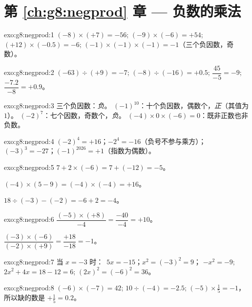 \section*{第 \ref{ch:g8:negprod} 章 --- 负数的乘法}

\begin{solution}{exo:g8:negprod:1}
$(-8) \times (+7) = -56$; \quad
$(-9) \times (-6) = +54$; \quad
$(+12) \times (-0.5) = -6$; \quad
$(-1) \times (-1) \times (-1) = -1$（三个负因数，奇数）。
\end{solution}

\begin{solution}{exo:g8:negprod:2}
$(-63) \div (+9) = -7$; \quad
$(-8) \div (-16) = +0.5$; \quad
$\dfrac{45}{-5} = -9$; \quad
$\dfrac{-7.2}{-8} = +0.9$。
\end{solution}

\begin{solution}{exo:g8:negprod:3}
三个负因数：\emph{负}。\quad
$(-1)^{10}$：十个负因数，偶数个，\emph{正}（其值为
$1$）。\quad
$(-2)^7$：七个因数，奇数个，\emph{负}。\quad
$(-4) \times 0 \times (-6) = 0$：既非正数也非负数。
\end{solution}

\begin{solution}{exo:g8:negprod:4}
$(-2)^4 = +16$；\quad $-2^4 = -16$（负号不参与乘方）；\quad
$(-3)^3 = -27$；\quad $(-1)^{2026} = +1$（指数为偶数）。
\end{solution}

\begin{solution}{exo:g8:negprod:5}
$7 + 2 \times (-6) = 7 + (-12) = -5$。

$(-4) \times (5 - 9) = (-4) \times (-4) = +16$。

$18 \div (-3) - (-2) = -6 + 2 = -4$。
\end{solution}

\begin{solution}{exo:g8:negprod:6}
$\dfrac{(-5) \times (+8)}{-4} = \dfrac{-40}{-4} = +10$。

$\dfrac{(-3) \times (-6)}{(-2) \times (+9)} = \dfrac{+18}{-18} = -1$。
\end{solution}

\begin{solution}{exo:g8:negprod:7}
当 $x = -3$ 时：\ $5x = -15$；\quad $x^2 = (-3)^2 = 9$；\quad
$-x^2 = -9$; \quad $2x^2 + 4x = 18 - 12 = 6$; \quad
$(2x)^2 = (-6)^2 = 36$。
\end{solution}

\begin{solution}{exo:g8:negprod:8}
$(-6) \times (-7) = 42$; \quad
$10 \div (-4) = -2.5$; \quad
$(-5) \times \frac15 = -1$，所以缺的数是
$+\frac15 = 0.2$。
\end{solution}

